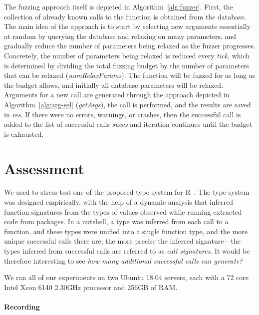 \documentclass[sigplan,nonacm,anonymous,review]{acmart}
\begin{document}
The fuzzing approach itself is depicted in Algorithm~\ref{alg:fuzzer}.
First, the collection of already known calls to the function is obtained
from the database.  The main idea of the approach is to start by
selecting new arguments essentially at random by querying the database
and relaxing on many parameters, and gradually reduce the number of
parameters being relaxed as the fuzzer progresses.  Concretely, the
number of parameters being relaxed is reduced every \emph{tick},
which is determined by dividing the total fuzzing budget by the number
of parameters that can be relaxed (\emph{numRelaxParams}).  The
function will be fuzzed for as long as the budget allows, and
initially all database parameters will be relaxed.  Arguments for a
new call are generated through the approach depicted in
Algorithm~\ref{alg:arg-sel} (\emph{getArgs}), the call is performed,
and the results are saved in \emph{res}.  If there were no errors,
warnings, or crashes, then the successful call is added to the list of
successful calls \emph{succs} and iteration continues until the
budget is exhausted.



\section{Assessment}
\label{sec:assessment}


We used \tool to stress-test one of the proposed type system for
R~\cite{turcotte2020designing}.  The type system was designed
empirically, with the help of a dynamic analysis that inferred
function signatures from the types of values observed while running
extracted code from packages.  In a nutshell, a type was inferred from
each call to a function, and these types were unified into a single
function type, and the more unique successful calls there are, the
more precise the inferred signature---the types inferred from
successful calls are referred to as \textit{call signatures}.  It
would be therefore interesting to see \emph{how many additional
successful calls can \tool generate?}

We ran all of our experiments on two Ubuntu 18.04 servers, each with a
72 core Intel Xeon 6140 2.30GHz processor and 256GB of RAM.

\paragraph{Recording}
\end{document}
